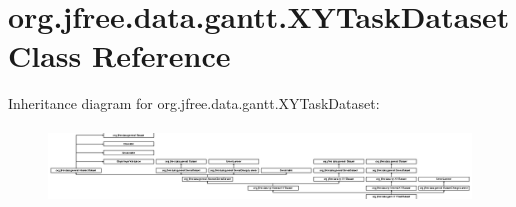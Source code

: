 \hypertarget{classorg_1_1jfree_1_1data_1_1gantt_1_1_x_y_task_dataset}{}\section{org.\+jfree.\+data.\+gantt.\+X\+Y\+Task\+Dataset Class Reference}
\label{classorg_1_1jfree_1_1data_1_1gantt_1_1_x_y_task_dataset}
Inheritance diagram for org.\+jfree.\+data.\+gantt.\+X\+Y\+Task\+Dataset\+:\begin{figure}[H]
\begin{center}
\leavevmode
\includegraphics[height=2.007169cm]{classorg_1_1jfree_1_1data_1_1gantt_1_1_x_y_task_dataset}
\end{center}
\end{figure}
